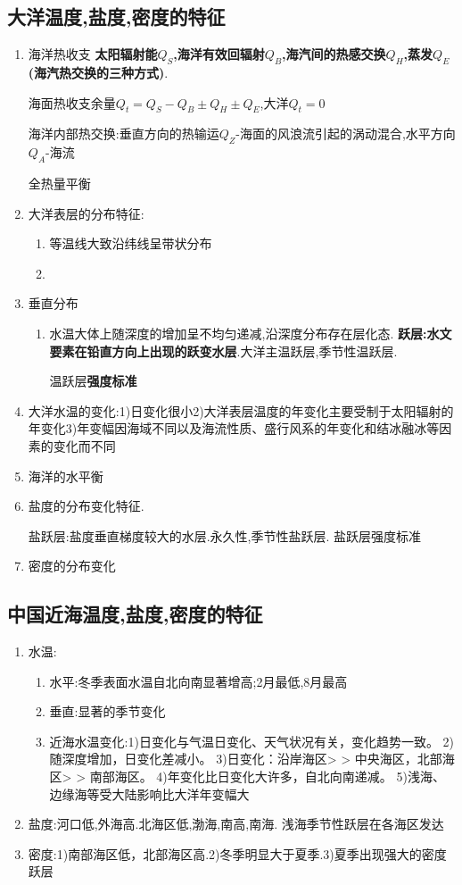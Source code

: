 	\subsection{大洋温度,盐度,密度的特征}
		\begin{enumerate}
			\item 	海洋热收支
			\textbf{太阳辐射能$Q_S$,海洋有效回辐射$Q_B$,海汽间的热感交换$Q_H$,蒸发$Q_E$(海汽热交换的三种方式)}.
			
			海面热收支余量$Q_t=Q_S-Q_B\pm Q_H\pm Q_E$,大洋$Q_t=0$
			
			海洋内部热交换:垂直方向的热输运$Q_Z$-海面的风浪流引起的涡动混合,水平方向$Q_A$-海流
			
			全热量平衡
			\item 大洋表层的分布特征:
				\begin{enumerate}
					\item 等温线大致沿纬线呈带状分布
					\item 
				\end{enumerate}
			\item 垂直分布
				\begin{enumerate}
					\item 水温大体上随深度的增加呈不均匀递减,沿深度分布存在层化态.
					\textbf{跃层:水文要素在铅直方向上出现的跃变水层}.大洋主温跃层,季节性温跃层.
					
					温跃层\textbf{强度标准}
				\end{enumerate}
			\item 大洋水温的变化:1)日变化很小2)大洋表层温度的年变化主要受制于太阳辐射的年变化3)年变幅因海域不同以及海流性质、盛行风系的年变化和结冰融冰等因素的变化而不同
			
			\item 海洋的水平衡
			\item 盐度的分布变化特征.
			
				盐跃层:盐度垂直梯度较大的水层.永久性,季节性盐跃层. 盐跃层强度标准
			\item 密度的分布变化
		\end{enumerate}
	\subsection{中国近海温度,盐度,密度的特征}
		\begin{enumerate}
			\item 水温:
				\begin{enumerate}
					\item 水平:冬季表面水温自北向南显著增高;2月最低,8月最高
					\item 垂直:显著的季节变化
					\item 近海水温变化:1)日变化与气温日变化、天气状况有关，变化趋势一致。
					2)随深度增加，日变化差减小。
					3)日变化：沿岸海区> > 中央海区，北部海区> > 南部海区。
					4)年变化比日变化大许多，自北向南递减。
					5)浅海、边缘海等受大陆影响比大洋年变幅大
				\end{enumerate}
			\item 盐度:河口低,外海高.北海区低,渤海,南高,南海. 浅海季节性跃层在各海区发达
			\item 密度:1)南部海区低，北部海区高.2)冬季明显大于夏季.3)夏季出现强大的密度跃层
		\end{enumerate}
	
			
			